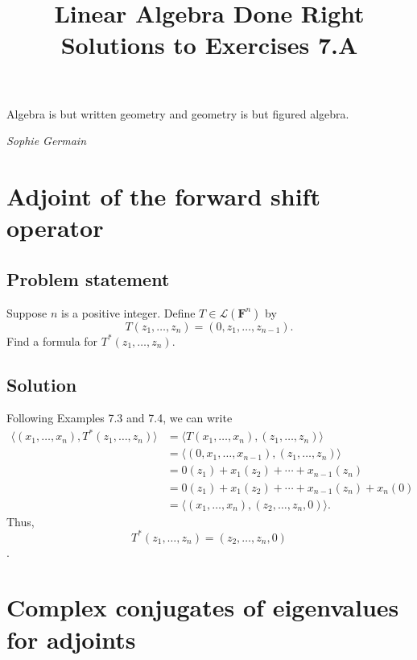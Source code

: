 \documentclass{article}
\title{Linear Algebra Done Right\\Solutions to Exercises 7.A}
\author{}
\date{}
\begin{document}
\maketitle

\epigraph{Algebra is but written geometry and geometry is but figured algebra.}{\textit{Sophie Germain}}

\section{Adjoint of the forward shift operator}
\subsection*{Problem statement}
Suppose $n$ is a positive integer. Define $T\in\mathcal{L}(\mathbf{F}^{n})$ by
\[T(z_1,\ldots,z_n)=(0,z_1,\ldots,z_{n-1}).\]
Find a formula for $T^*(z_1,\ldots,z_n)$.

\subsection*{Solution}
Following Examples 7.3 and 7.4, we can write
\begin{align*} 
\langle(x_1,\ldots,x_n),T^*(z_1,\ldots,z_n)\rangle &= \langle T(x_1,\ldots,x_n),(z_1,\ldots,z_n)\rangle \\ 
 &= \langle (0,x_1,\ldots,x_{n-1}),(z_1,\ldots,z_n)\rangle \\
 &= 0(z_1) + x_1(z_2) + \cdots + x_{n-1}(z_n) \\
 &= 0(z_1) + x_1(z_2) + \cdots + x_{n-1}(z_n) + x_n(0) \\
 &= \langle (x_1,\ldots,x_n),(z_2,\ldots,z_n,0)\rangle.
\end{align*}
Thus,
\[T^*(z_1,\ldots,z_n)=(z_2,\ldots,z_n,0)\].

\clearpage

\section{Complex conjugates of eigenvalues for adjoints}
\end{document}
